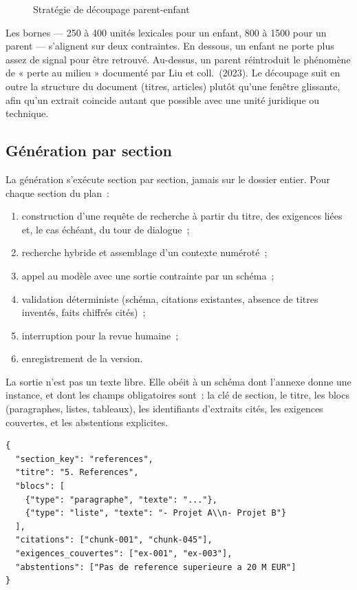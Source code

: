\begin{figure}[htbp]
  \centering
  \resizebox{\linewidth}{!}{}
  \caption{Stratégie de découpage parent-enfant}
  \label{fig:parent-enfant}
\end{figure}

Les bornes --- 250 à 400 unités lexicales pour un enfant, 800 à 1500 pour
un parent --- s'alignent sur deux contraintes. En dessous, un enfant ne
porte plus assez de signal pour être retrouvé. Au-dessus, un parent
réintroduit le phénomène de « perte au milieu » documenté par Liu et
coll.\ (2023). Le découpage suit en outre la structure du document
(titres, articles) plutôt qu'une fenêtre glissante, afin qu'un extrait
coincide autant que possible avec une unité juridique ou technique.

\subsection{Génération par section}

La génération s'exécute section par section, jamais sur le dossier entier.
Pour chaque section du plan~:

\begin{enumerate}
  \item construction d'une requête de recherche à partir du titre, des
        exigences liées et, le cas échéant, du tour de dialogue~;
  \item recherche hybride et assemblage d'un contexte numéroté~;
  \item appel au modèle avec une sortie contrainte par un schéma~;
  \item validation déterministe (schéma, citations existantes, absence de
        titres inventés, faits chiffrés cités)~;
  \item interruption pour la revue humaine~;
  \item enregistrement de la version.
\end{enumerate}

La sortie n'est pas un texte libre. Elle obéit à un schéma dont l'annexe
donne une instance, et dont les champs obligatoires sont~: la clé de
section, le titre, les blocs (paragraphes, listes, tableaux), les
identifiants d'extraits cités, les exigences couvertes, et les
abstentions explicites.

\begin{lstlisting}[style=btpjson, caption={Schéma de sortie d'une section générée},
                   label={lst:schema-section}]
{
  "section_key": "references",
  "titre": "5. References",
  "blocs": [
    {"type": "paragraphe", "texte": "..."},
    {"type": "liste", "texte": "- Projet A\\n- Projet B"}
  ],
  "citations": ["chunk-001", "chunk-045"],
  "exigences_couvertes": ["ex-001", "ex-003"],
  "abstentions": ["Pas de reference superieure a 20 M EUR"]
}
\end{lstlisting}

